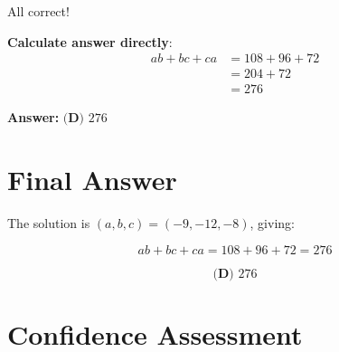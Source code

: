 \documentclass[12pt]{article}
\begin{document}
All correct!

\textbf{Calculate answer directly}:
\begin{align*}
ab + bc + ca &= 108 + 96 + 72\\
&= 204 + 72\\
&= 276
\end{align*}

\textbf{Answer: } $\boxed{\textbf{(D) } 276}$

\section*{Final Answer}

The solution is $(a, b, c) = (-9, -12, -8)$, giving:

$$ab + bc + ca = 108 + 96 + 72 = 276$$

$$\boxed{\textbf{(D) } 276}$$

\section*{Confidence Assessment}
\end{document}

